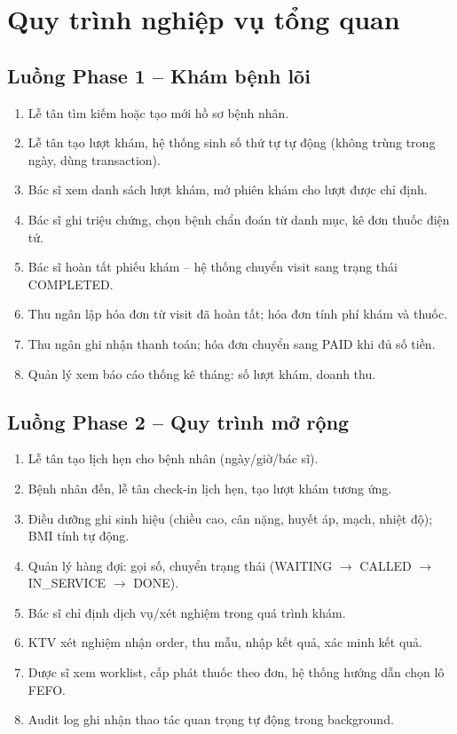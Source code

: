 \section{Quy trình nghiệp vụ tổng quan}
\label{sec:srs-business-flow}

\subsection*{Luồng Phase 1 -- Khám bệnh lõi}

\begin{enumerate}
    \item Lễ tân tìm kiếm hoặc tạo mới hồ sơ bệnh nhân.
    \item Lễ tân tạo lượt khám, hệ thống sinh số thứ tự tự động (không trùng trong ngày, dùng transaction).
    \item Bác sĩ xem danh sách lượt khám, mở phiên khám cho lượt được chỉ định.
    \item Bác sĩ ghi triệu chứng, chọn bệnh chẩn đoán từ danh mục, kê đơn thuốc điện tử.
    \item Bác sĩ hoàn tất phiếu khám -- hệ thống chuyển visit sang trạng thái COMPLETED.
    \item Thu ngân lập hóa đơn từ visit đã hoàn tất; hóa đơn tính phí khám và thuốc.
    \item Thu ngân ghi nhận thanh toán; hóa đơn chuyển sang PAID khi đủ số tiền.
    \item Quản lý xem báo cáo thống kê tháng: số lượt khám, doanh thu.
\end{enumerate}

\subsection*{Luồng Phase 2 -- Quy trình mở rộng}

\begin{enumerate}
    \item Lễ tân tạo lịch hẹn cho bệnh nhân (ngày/giờ/bác sĩ).
    \item Bệnh nhân đến, lễ tân check-in lịch hẹn, tạo lượt khám tương ứng.
    \item Điều dưỡng ghi sinh hiệu (chiều cao, cân nặng, huyết áp, mạch, nhiệt độ); BMI tính tự động.
    \item Quản lý hàng đợi: gọi số, chuyển trạng thái (WAITING $\rightarrow$ CALLED $\rightarrow$ IN\_SERVICE $\rightarrow$ DONE).
    \item Bác sĩ chỉ định dịch vụ/xét nghiệm trong quá trình khám.
    \item KTV xét nghiệm nhận order, thu mẫu, nhập kết quả, xác minh kết quả.
    \item Dược sĩ xem worklist, cấp phát thuốc theo đơn, hệ thống hướng dẫn chọn lô FEFO.
    \item Audit log ghi nhận thao tác quan trọng tự động trong background.
\end{enumerate}

